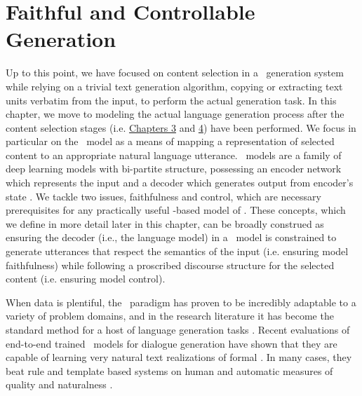 \chapter{Faithful and Controllable Generation}
\label{ch:nlg}

\startglyph Up to this point, we have  focused on content selection in a
\texttotext~generation system while relying on a trivial text generation
algorithm, copying or extracting text units verbatim from the input, to perform
the actual generation task.  In this chapter, we move to modeling the actual
language generation process after the content selection stages (i.e.
\hyperref[ch:dlsum]{Chapters 3} and \hyperref[ch:mlsum]{4}) have been
performed.  We focus in particular on the \sequencetosequence~model as a means
of mapping a representation of selected content to an appropriate natural
language utterance. \Sequencetosequence~models are a family of deep learning
models with bi-partite structure, possessing an encoder network which
represents the input and a decoder which generates output from encoder's state
\citep{sutskever2014}.  We tackle two issues, faithfulness and control, which
are necessary prerequisites for any practically useful
\sequencetosequence-based model of \naturallanguagegeneration.  These concepts,
which we define in more detail later in this chapter, can be broadly construed
as ensuring the decoder (i.e., the language model) in a
\sequencetosequence~model is constrained to generate utterances that respect
the semantics of the input (i.e. ensuring model faithfulness) while following a
proscribed discourse structure for the selected content (i.e. ensuring model
control).

When data is plentiful, the \sequencetosequence~paradigm has proven to be
incredibly adaptable to a variety of problem domains, and in the research
literature it has become the standard method for a host of language generation
tasks \citep{xu2015,dusek2016,vaswani2017,fan2018}.  Recent evaluations of
end-to-end trained \sequencetosequence~models for dialogue generation have
shown that they are capable of learning very natural text realizations of
formal \meaningrepresentation. In many cases, they  beat rule and template
based systems on human and automatic measures of quality and naturalness
\citep{dusek2020}.
 


